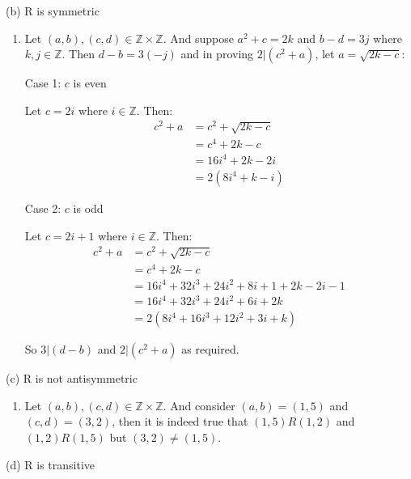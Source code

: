 \documentclass{article}
\begin{document}
    (b) R is symmetric 

    \begin{enumerate}[label=\quad\quad, leftmargin=*]
        \item 
        Let $(a,b),(c,d)\in \mathbb{Z}\times \mathbb{Z}$. And suppose $a^2+c=2k$ and $b-d=3j$ where $k,j\in \mathbb{Z}$.
        Then $d-b=3(-j)$ and in proving $2|(c^2+a)$, let $a=\sqrt{2k-c}$:

        Case 1: $c$ is even

        \quad Let $c=2i$ where $i\in \mathbb{Z}$. Then:
        \begin{align*}
            c^2+a & = c^2+\sqrt{2k-c} \\
            & = c^4 + 2k -c \\
            & = 16i^4 + 2k - 2i \\
            & = 2(8i^4+k-i)
        \end{align*}

        Case 2: $c$ is odd

        \quad Let $c=2i+1$ where $i\in \mathbb{Z}$. Then:
        \begin{align*}
            c^2+a & = c^2+\sqrt{2k-c} \\
            & = c^4 + 2k -c \\
            & = 16i^4+32i^3+24i^2+8i+1+2k-2i-1 \\
            & = 16i^4+32i^3+24i^2+6i+2k \\
            & = 2(8i^4+16i^3+12i^2+3i+k)
        \end{align*}

        So $3|(d-b)$ and $2|(c^2+a)$ as required.
    \end{enumerate}

    (c) R is not antisymmetric 

    \begin{enumerate}[label=\quad\quad, leftmargin=*]
        \item 
        Let $(a,b),(c,d)\in \mathbb{Z}\times \mathbb{Z}$. And consider $(a,b)=(1,5)$ and $(c,d)=(3,2)$, then 
        it is indeed true that $(1,5)R(1,2)$ and $(1,2)R(1,5)$ but $(3,2)\neq (1,5)$.
    \end{enumerate}

    (d) R is transitive
\end{document}
